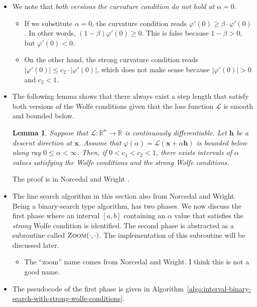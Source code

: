 \documentclass[10pt]{article}
\newtheorem{lemma}{Lemma}
\newcommand{\ve}[1]{\mathbf{#1}}
\newcommand{\ra}{\rightarrow}
\newcommand{\mcal}[1]{\mathcal{#1}}
\newcommand{\Real}{\mathbb{R}}
\begin{document}
\begin{itemize}
    \item We note that \emph{both versions the curvature condition do not hold at $\alpha = 0$}.
    \begin{itemize}
        \item If we substitute $\alpha = 0$, the curvature condition reads $\varphi'(0) \geq \beta \cdot \varphi'(0)$. In other words, $(1 - \beta) \varphi'(0) \geq 0$. This is false because $1 - \beta > 0$, but $\varphi'(0) < 0$.
        \item On the other hand, the strong curvature condition reads $|\varphi'(0)| \leq c_2 \cdot |\varphi'(0)|$, which does not make sense because $|\varphi'(0)| > 0$ and $c_2 < 1$.
    \end{itemize}

    \item The following lemma shows that there always exist a step length that satisfy both versions of the Wolfe conditions given that the loss function $\mcal{L}$ is smooth and bounded below.
    
    \begin{lemma}
        Suppose that $\mcal{L}: \Real^n \ra \Real$ is continuously differentiable. Let $\ve{h}$ be a descent direction at $\ve{x}$. Assume that $\varphi(\alpha) = \mcal{L}(\ve{x} + \alpha \ve{h})$ is bounded below along ray $0 \leq \alpha < \infty$. Then, if $0 < c_1 < c_2 < 1$, there exists intervals of $\alpha$ values satisfying the Wolfe conditions and the strong Wolfe conditions.
    \end{lemma}

    The proof is in Norcedal and Wright \cite{Norcedal:2006}.
     
    \item The line search algorithm in this section also from Norcedal and Wright. Being a binary-search type algorithm, has two phases. We now discuss the first phase where an interval $[a,b]$ containing an $\alpha$ value that satisfies the \emph{strong} Wolfe condition is identified. The second phase is abstracted as a subroutine called $\Call{Zoom}{\cdot,\cdot}$. The implementation of this subroutine will be discussed later.
    \begin{itemize}
        \item The ``zoom'' name comes from Norcedal and Wright. I think this is not a good name.
    \end{itemize}

    \item The pseudocode of the first phase is given in Algorithm~\ref{algo:interval-binary-search-with-strong-wolfe-conditions}.
    

\end{itemize}
\end{document}
